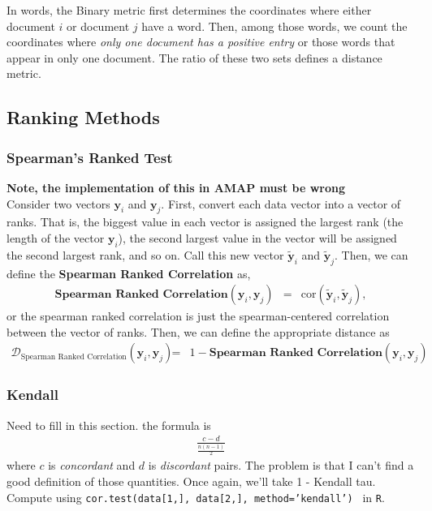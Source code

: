 \documentclass[11pt,letterpaper]{article}
\numberwithin{equation}{section}
\begin{document}
In words, the Binary metric first determines the coordinates where
either document $i$ or document $j$ have a word.  Then, among those
words, we count the coordinates where \emph{only one document has a
positive entry} or those words that appear in only one document. The
ratio of these two sets defines a distance metric.
\subsection{Ranking Methods}
\subsubsection{Spearman's Ranked Test}
\textbf{Note, the implementation of this in AMAP must be wrong} \\
Consider two vectors $\boldsymbol{y}_i$ and $\boldsymbol{y}_j$.
First, convert each data vector into a vector of ranks.  That is,
the biggest value in each vector is assigned the largest rank (the
length of the vector $\boldsymbol{y}_i$), the second largest value
in the vector will be assigned the second largest rank, and so on.
Call this new vector $\tilde{\boldsymbol{y}}_i$ and
$\tilde{\boldsymbol{y}}_j$.  Then, we can define the
\textbf{Spearman Ranked Correlation} as,
\begin{eqnarray}
\textbf{Spearman Ranked Correlation}(\boldsymbol{y}_i,
\boldsymbol{y}_j) & = & \text{cor}(\tilde{\boldsymbol{y}}_i,
\tilde{\boldsymbol{y}}_j ), \nonumber
\end{eqnarray}
or the spearman ranked correlation is just the spearman-centered
correlation between the vector of ranks.  Then, we can define the
appropriate distance as
\begin{eqnarray}
\mathcal{D}_{\text{Spearman Ranked Correlation}}(\boldsymbol{y}_i,
\boldsymbol{y}_j)  & = &  1 - \textbf{Spearman Ranked
Correlation}(\boldsymbol{y}_i, \boldsymbol{y}_j) \nonumber
\end{eqnarray}
\subsubsection{Kendall}
Need to fill in this section.  the formula is
\begin{eqnarray}
\frac{c - d }{\frac{n(n-1)}{2}} \nonumber
\end{eqnarray}
where $c$ is \emph{concordant} and $d$ is \emph{discordant} pairs.
The problem is that I can't find a good definition of those
quantities.  Once again, we'll take 1 - Kendall tau.  Compute using
{\tt cor.test(data[1,], data[2,], method='kendall') } in {\tt R}.
\end{document}
